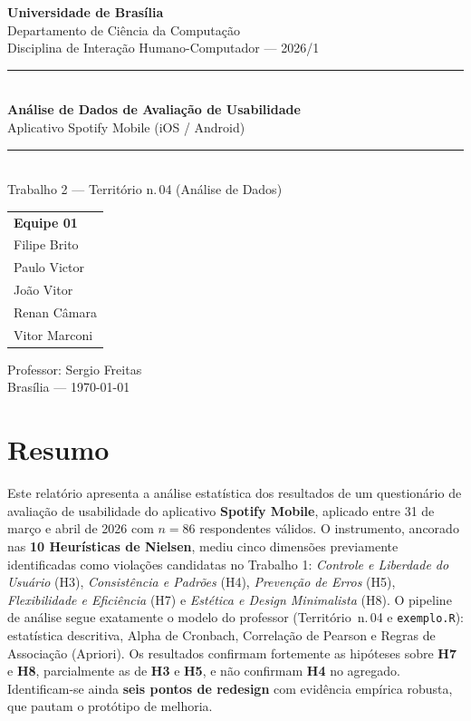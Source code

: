 \documentclass[12pt,a4paper]{article}
\begin{document}
\begin{titlepage}
\centering
\vspace*{1.5cm}
{\Large\textbf{Universidade de Brasília}}\\[0.3cm]
{\large Departamento de Ciência da Computação}\\[0.3cm]
{\large Disciplina de Interação Humano-Computador --- 2026/1}\\[2.5cm]

{\color{spotgreen}\rule{\linewidth}{2pt}}\\[0.8cm]
{\huge\bfseries Análise de Dados de Avaliação de Usabilidade}\\[0.4cm]
{\Large Aplicativo Spotify Mobile (iOS / Android)}\\[0.4cm]
{\color{spotgreen}\rule{\linewidth}{2pt}}\\[1.5cm]

{\large Trabalho 2 --- Território n.\,04 (Análise de Dados)}\\[2cm]

\begin{tabular}{l}
\textbf{Equipe 01}\\[0.2cm]
Filipe Brito\\
Paulo Victor\\
João Vitor\\
Renan Câmara\\
Vitor Marconi\\
\end{tabular}

\vfill
{\large Professor: Sergio Freitas}\\[0.3cm]
{\large Brasília --- \today}
\end{titlepage}

\section*{Resumo}
Este relatório apresenta a análise estatística dos resultados de um questionário de
avaliação de usabilidade do aplicativo \textbf{Spotify Mobile}, aplicado entre 31 de março
e abril de 2026 com $n = 86$ respondentes válidos. O instrumento, ancorado nas \textbf{10
Heurísticas de Nielsen}, mediu cinco dimensões previamente identificadas como violações
candidatas no Trabalho 1: \emph{Controle e Liberdade do Usuário} (H3), \emph{Consistência
e Padrões} (H4), \emph{Prevenção de Erros} (H5), \emph{Flexibilidade e Eficiência} (H7)
e \emph{Estética e Design Minimalista} (H8). O pipeline de análise segue exatamente o
modelo do professor (Território~n.\,04 e \texttt{exemplo.R}): estatística descritiva,
Alpha de Cronbach, Correlação de Pearson e Regras de Associação (Apriori).
Os resultados confirmam fortemente as hipóteses sobre \textbf{H7} e \textbf{H8},
parcialmente as de \textbf{H3} e \textbf{H5}, e não confirmam \textbf{H4} no agregado.
Identificam-se ainda \textbf{seis pontos de redesign} com evidência empírica robusta,
que pautam o protótipo de melhoria.
\end{document}

